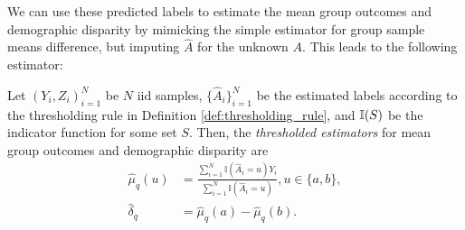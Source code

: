 We can use these predicted labels to estimate the mean group outcomes 
and demographic disparity by mimicking the simple estimator for 
group sample means difference, but imputing $\hat A$ for the
unknown $A$. This leads to the following estimator:

\begin{definition}
\label{def:thresholded_estimator}
Let $(Y_i, Z_i)_{i=1}^N$ be $N$ iid samples, $\{\hat{A}_i\}_{i=1}^N$ be the estimated labels according to the thresholding rule in Definition \ref{def:thresholding_rule}, and $\mathbb{I}(S)$ be the indicator function for some set $S$. Then, the \textit{thresholded estimators} for mean group outcomes and demographic disparity are
%
\begin{align}
\hat{\mu}_{q}(u) & = \frac{\sum_{i = 1}^N \mathbb{I}(\hat{A}_i  = u)Y_i}{\sum_{i = 1}^N \mathbb{I}(\hat{A}_i  = u)}, u\in\{a,b\},  \nonumber \\
\hat{\delta}_{q} & = \hat{\mu}_{q}(a) - \hat{\mu}_{q}(b). \label{demo: est_race}
\end{align}
\end{definition}



